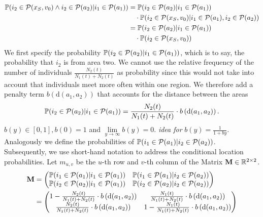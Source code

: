 \begin{align*}
\mathbb{P}(i_2 \in \mathcal{P}(x_S, v_0) \wedge i_2 \in \mathcal{P}(a_2) | i_1 \in \mathcal{P}(a_1)) &= \mathbb{P}(i_2 \in \mathcal{P}(a_2) | i_1 \in \mathcal{P}(a_1) )  \notag \\
& \quad \cdot \mathbb{P}(i_2 \in \mathcal{P}(x_S, v_0) | i_1 \in \mathcal{P}(a_1), i_2 \in \mathcal{P}(a_2) ) \notag \\
&= \mathbb{P}(i_2 \in \mathcal{P}(a_2) | i_1 \in \mathcal{P}(a_1) )  \notag \\
& \quad \cdot \mathbb{P}(i_2 \in \mathcal{P}(x_S, v_0))
\end{align*} 
We first specify the probability $\mathbb{P}(i_2 \in \mathcal{P}(a_2) | i_1 \in \mathcal{P}(a_1) )$, which is to say, the probability that $i_2$ is from area two. We cannot use the relative frequency of the number of individuals $\frac{N_{2}(t)}{N_1(t) + N_2(t)}$ as probability since this would not take into account that individuals meet more often within one region. We therefore add a penalty term $b\left(\text{d}(a_1, a_2) \right)$ that accounts for the distance between the areas
\begin{align*}
\mathbb{P}(i_2 \in \mathcal{P}(a_2) | i_1 \in \mathcal{P}(a_1) ) = \frac{N_{2}(t)}{N_1(t) + N_2(t)} \cdot b\left(\text{d}(a_1, a_2) \right).
\end{align*}
$b(y) \in [0,1], b\left(0\right) = 1$ and $\lim\limits_{y \to \infty} b\left(y\right) = 0$. \textit{idea for} $b(y)= \frac{1}{1 + b y}$. Analogously we define the probabilities of $\mathbb{P}(i_1 \in \mathcal{P}(a_1) | i_2 \in \mathcal{P}(a_2) )$. Subsequently, we use short-hand notation to address the conditional location probabilities. Let $m_{u,v}$ be the $u$-th row and $v$-th column of the Matrix $\mathbf{M} \in \mathbb{R}^{2 \times 2}$.
\begin{align*}
\mathbf{M} &= \begin{pmatrix} 
\mathbb{P}(i_1 \in \mathcal{P}(a_1) | i_1 \in \mathcal{P}(a_1) ) & \mathbb{P}(i_1 \in \mathcal{P}(a_1) | i_2 \in \mathcal{P}(a_2) ) \\
\mathbb{P}(i_2 \in \mathcal{P}(a_2) | i_1 \in \mathcal{P}(a_1) ) & \mathbb{P}(i_2 \in \mathcal{P}(a_2) | i_2 \in \mathcal{P}(a_2) )
\end{pmatrix} \notag \\
&= \begin{pmatrix} 
1 - \frac{N_{2}(t)}{N_1(t) + N_2(t)} \cdot b\left(\text{d}(a_1, a_2) \right) & \frac{N_{1}(t)}{N_1(t) + N_2(t)} \cdot b\left(\text{d}(a_1, a_2) \right) \\
\frac{N_{2}(t)}{N_1(t) + N_2(t)} \cdot b\left(\text{d}(a_1, a_2) \right) & 1 - \frac{N_{1}(t)}{N_1(t) + N_2(t)} \cdot b\left(\text{d}(a_1, a_2) \right)
\end{pmatrix}
\end{align*}

